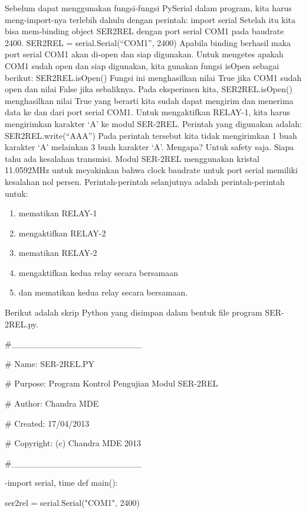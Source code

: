 \begin{enumerate}
Sebelum dapat menggunakan fungsi-fungsi PySerial dalam program, kita harus meng-import-nya terlebih dahulu dengan perintah:
import serial
Setelah itu  kita bisa mem-binding object SER2REL dengan port serial COM1 pada baudrate 2400.
SER2REL = serial.Serial(“COM1”, 2400)
Apabila  binding berhasil maka port serial COM1 akan di-open dan siap digunakan. Untuk mengetes apakah COM1 sudah open dan siap digunakan, kita gunakan fungsi isOpen sebagai berikut:
SER2REL.isOpen()
Fungsi ini menghasilkan nilai True jika COM1 sudah open dan nilai False jika sebaliknya. Pada eksperimen kita, SER2REL.isOpen() menghasilkan nilai True yang berarti kita sudah dapat mengirim dan menerima data ke dan dari port serial COM1.
Untuk mengaktifkan RELAY-1, kita harus mengirimkan karakter ‘A’ ke modul SER-2REL. Perintah yang digunakan adalah:
SER2REL.write(“AAA”)
Pada perintah tersebut kita tidak mengirimkan 1 buah karakter ‘A’ melainkan 3 buah karakter ‘A’. Mengapa? Untuk safety saja. Siapa tahu ada kesalahan transmisi.  
Modul SER-2REL menggunakan kristal 11.0592MHz untuk meyakinkan bahwa clock baudrate untuk port serial memiliki kesalahan nol persen.
Perintah-perintah selanjutnya adalah perintah-perintah untuk:
\begin{enumerate}
\item mematikan RELAY-1
\item mengaktifkan RELAY-2
\item mematikan RELAY-2
\item mengaktifkan kedua relay secara bersamaan
\item dan mematikan kedua relay secara bersamaan.
\end{enumerate}

Berikut adalah skrip Python  yang disimpan dalam bentuk file program SER-2REL.py.

\#\_\_\_\_\_\_\_\_\_\_\_\_\_\_\_\_\_\_\_\_\_

\# Name:         SER-2REL.PY 

\# Purpose:      Program Kontrol Pengujian Modul SER-2REL 

\# Author:       Chandra MDE 

\# Created:      17/04/2013 

\# Copyright:    (c) Chandra MDE 2013 

\#\_\_\_\_\_\_\_\_\_\_\_\_\_\_\_\_\_\_\_\_\_



-import serial, time 
def main(): 

    ser2rel = serial.Serial("COM1", 2400) 
    

\end{enumerate}
